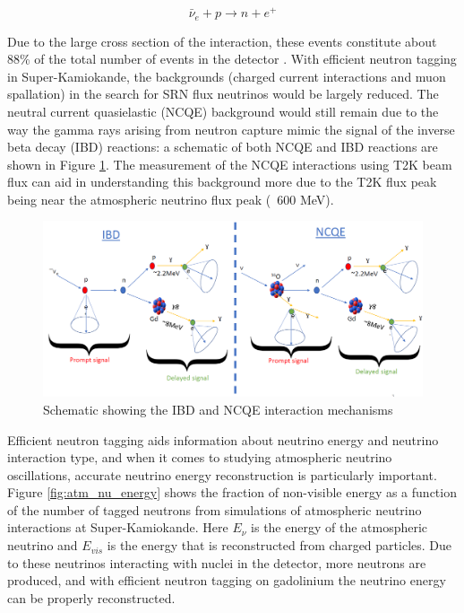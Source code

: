 \begin{equation}
    \bar{\nu}_{e}+p \rightarrow n+e^{+}
\label{eq:IBD_equation}
\end{equation}

Due to the large cross section of the interaction, these events constitute about 88\% of the total number of events in the detector \cite{marti_evaluation_2020}. With efficient neutron tagging in Super-Kamiokande, the backgrounds (charged current interactions and muon spallation) in the search for SRN flux neutrinos would be largely reduced. The neutral current quasielastic (NCQE) background would still remain due to the way the gamma rays arising from neutron capture mimic the signal of the inverse beta decay (IBD) reactions: a schematic of both NCQE and IBD reactions are shown in Figure \ref{fig:NCQE_IBD}. The measurement of the NCQE interactions using T2K beam flux can aid in understanding this background more due to the T2K flux peak being near the atmospheric neutrino flux peak (~600 MeV). 


\begin{figure}[H]
    \includegraphics[width=\textwidth]{Figures/schematic.png}
\caption{Schematic showing the IBD and NCQE interaction mechanisms}
\label{fig:NCQE_IBD}
\end{figure}


Efficient neutron tagging aids information about neutrino energy and neutrino interaction type, and when it comes to studying atmospheric neutrino oscillations, accurate neutrino energy reconstruction is particularly important. Figure \ref{fig:atm_nu_energy} shows the fraction of non-visible energy as a function of the number of tagged neutrons from simulations of atmospheric neutrino interactions at Super-Kamiokande. Here $E_{\nu}$ is the energy of the atmospheric neutrino and $E_{vis}$ is the energy that is reconstructed from charged particles. Due to these neutrinos interacting with nuclei in the detector, more neutrons are produced, and with efficient neutron tagging on gadolinium the neutrino energy can be properly reconstructed. 

